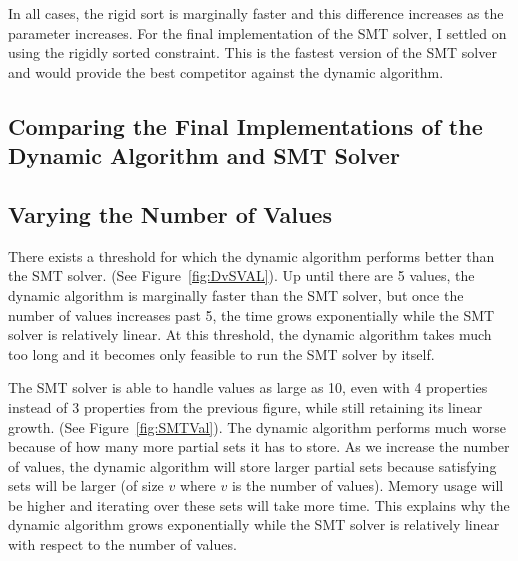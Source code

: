 \documentclass[pageno]{jpaper}
\begin{document}
In all cases, the rigid sort is marginally faster and this difference increases as the parameter increases. For the final implementation of the SMT solver, I settled on using the rigidly sorted constraint. This is the fastest version of the SMT solver and would provide the best competitor against the dynamic algorithm.




\subsection{Comparing the Final Implementations of the Dynamic Algorithm and SMT Solver}

\subsection{Varying the Number of Values}

There exists a threshold for which the dynamic algorithm performs better than the SMT solver. (See Figure~\ref{fig:DvSVAL}). Up until there are 5 values, the dynamic algorithm is marginally faster than the SMT solver, but once the number of values increases past 5, the time grows exponentially while the SMT solver is relatively linear. At this threshold, the dynamic algorithm takes much too long and it becomes only feasible to run the SMT solver by itself. 

The SMT solver is able to handle values as large as 10, even with 4 properties instead of 3 properties from the previous figure, while still retaining its linear growth. (See Figure~\ref{fig:SMTVal}). The dynamic algorithm performs much worse because of how many more partial sets it has to store. As we increase the number of values, the dynamic algorithm will store larger partial sets because satisfying sets will be larger (of size $v$ where $v$ is the number of values). Memory usage will be higher and iterating over these sets will take more time. This explains why the dynamic algorithm grows exponentially while the SMT solver is relatively linear with respect to the number of values. 
\end{document}
